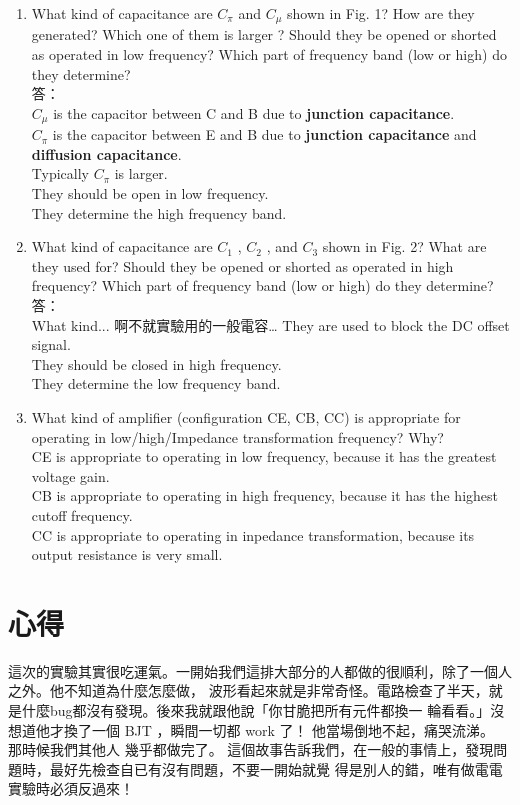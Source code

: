 \documentclass[12pt, a4paper]{article}
\begin{document}
\begin{enumerate}[itemsep=20pt, topsep=10pt]
  \item {What kind of capacitance are $C_\pi$ and $C_\mu$ shown in Fig. 1? How are they generated? Which one of them is larger ?
      Should they be opened or shorted as operated in low frequency? Which part of frequency band (low or high) 
do they determine? } \\[10pt]
    答：\\
    $C_\mu$ is the capacitor between C and B due to {\bf junction capacitance}. \\
    $C_\pi$ is the capacitor between E and B due to {\bf junction capacitance} and {\bf diffusion capacitance}. \\
    Typically $C_\pi$ is larger.  \\
    They should be open in low frequency. \\
    They determine the high frequency band.

  \item{What kind of capacitance are $C_1$ , $C_2$ , and $C_3$ shown in Fig. 2? What are they used for? Should they be opened or shorted as operated in high frequency? Which part of frequency band (low or high) do they determine? } \\[10pt]
    答：\\
    What kind... 啊不就實驗用的一般電容…
    They are used to block the DC offset signal. \\
    They should be closed in high frequency. \\
    They determine the low frequency band. \\

  \item{What kind of amplifier (configuration CE, CB, CC) is appropriate for operating in low/high/Impedance transformation frequency? Why?}
    \\[10pt]
    CE is appropriate to operating in low frequency, because it has the greatest voltage gain. \\
    CB is appropriate to operating in high frequency, because it has the highest cutoff frequency. \\
    CC is appropriate to operating in inpedance transformation, because its output resistance is very small.

\end{enumerate}

\section{心得}
這次的實驗其實很吃運氣。一開始我們這排大部分的人都做的很順利，除了一個人之外。他不知道為什麼怎麼做，
波形看起來就是非常奇怪。電路檢查了半天，就是什麼bug都沒有發現。後來我就跟他說「你甘脆把所有元件都換一
輪看看。」沒想道他才換了一個 BJT ，瞬間一切都 work 了！ 他當場倒地不起，痛哭流涕。 那時候我們其他人
幾乎都做完了。 這個故事告訴我們，在一般的事情上，發現問題時，最好先檢查自已有沒有問題，不要一開始就覺
得是別人的錯，唯有做電電實驗時必須反過來！
\end{document}
